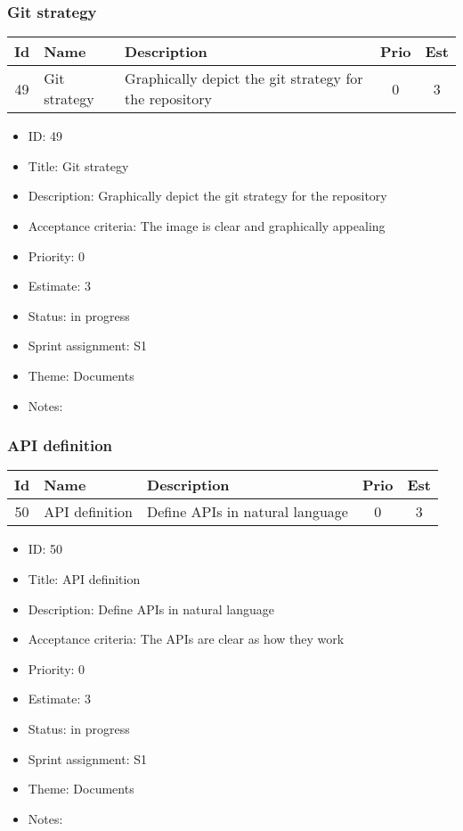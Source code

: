 \newpage
\subsubsection{Git strategy}
\begin{tabular}{|c|m{1.5cm}|m{4cm}|c|c|}
	\hline
	\textbf{Id}&\textbf{Name}&\textbf{Description}&\textbf{Prio}&\textbf{Est}\\
	\hline
	49 & Git strategy & 
	Graphically depict the git strategy for the repository &
	0 & 3 \\
	\hline
\end{tabular}
\begin{itemize}
	\item ID: 49
	\item Title: Git strategy
	\item Description: Graphically depict the git strategy for the repository
	\item Acceptance criteria: The image is clear and graphically appealing
	\item Priority: 0
	\item Estimate: 3
	\item Status: in progress
	\item Sprint assignment: S1
	\item Theme: Documents
	\item Notes:
\end{itemize}

\newpage
\subsubsection{API definition}
\begin{tabular}{|c|m{1.5cm}|m{4cm}|c|c|}
	\hline
	\textbf{Id}&\textbf{Name}&\textbf{Description}&\textbf{Prio}&\textbf{Est}\\
	\hline
	50 & API definition & 
	Define APIs in natural language &
	0 & 3 \\
	\hline
\end{tabular}
\begin{itemize}
	\item ID: 50
	\item Title: API definition
	\item Description: Define APIs in natural language
	\item Acceptance criteria: The APIs are clear as how they work
	\item Priority: 0
	\item Estimate: 3
	\item Status: in progress
	\item Sprint assignment: S1
	\item Theme: Documents
	\item Notes:
\end{itemize}

